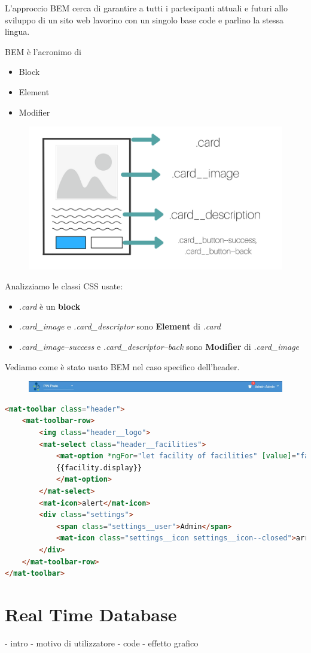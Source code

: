 L'approccio BEM cerca di garantire a tutti i partecipanti attuali e futuri allo sviluppo di un sito web
lavorino con un singolo base code e parlino la stessa lingua. 

BEM è l'acronimo di 
\begin{itemize}
\item Block
\item Element
\item Modifier
\end{itemize}

\begin{figure}[H]
    \centering  
    \includegraphics[scale=0.4]{img/cap3/bem}
\end{figure}

Analizziamo le classi CSS usate:

\begin{itemize}
    \item \textit{.card} è un \textbf{block}
    \item \textit{.card{\_}image} e  \textit{.card{\_}descriptor} sono \textbf{Element} di \textit{.card}
    \item \textit{.card{\_}image--success} e  \textit{.card{\_}descriptor--back} sono 
    \textbf{Modifier} di \textit{.card{\_}image}
\end{itemize}

Vediamo come è stato usato BEM nel caso specifico dell'header.

\begin{figure}[H]
    \centering  
    \includegraphics[scale=0.4]{img/cap3/header}
\end{figure}

\begin{lstlisting}[language=html]
<mat-toolbar class="header">
    <mat-toolbar-row>
        <img class="header__logo">
        <mat-select class="header__facilities">
            <mat-option *ngFor="let facility of facilities" [value]="facility.value">
            {{facility.display}}
            </mat-option>
        </mat-select>
        <mat-icon>alert</mat-icon>
        <div class="settings">
            <span class="settings__user">Admin</span>
            <mat-icon class="settings__icon settings__icon--closed">arrow-down</mat-icon>
        </div>
    </mat-toolbar-row>
</mat-toolbar>
\end{lstlisting}

\section{Real Time Database}
- intro
- motivo di utilizzatore
- code
- effetto grafico
